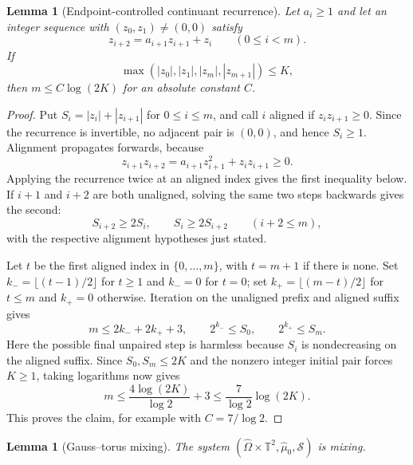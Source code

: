 \documentclass[11pt,a4paper]{amsart}
\newtheorem{lemma}[theorem]{Lemma}
\theoremstyle{definition}
\theoremstyle{remark}
\newcommand{\T}{\mathbb T}
\begin{document}
\begin{lemma}[Endpoint-controlled continuant recurrence]
\label{lem:endpoint-recurrence}
Let $a_i\ge1$ and let an integer sequence with $(z_0,z_1)\ne(0,0)$ satisfy
\[
 z_{i+2}=a_{i+1}z_{i+1}+z_i\qquad(0\le i<m).
\]
If
\[
 \max(|z_0|,|z_1|,|z_m|,|z_{m+1}|)\le K,
\]
then $m\le C\log(2K)$ for an absolute constant $C$.
\end{lemma}

\begin{proof}
Put $S_i=|z_i|+|z_{i+1}|$ for $0\le i\le m$, and call $i$ aligned if
$z_i z_{i+1}\ge0$.  Since the recurrence is invertible, no adjacent pair is
$(0,0)$, and hence $S_i\ge1$.  Alignment propagates forwards,
because
\[
 z_{i+1}z_{i+2}
 =a_{i+1}z_{i+1}^2+z_i z_{i+1}\ge0.
\]
Applying the recurrence twice at an aligned index gives the first inequality
below.  If $i+1$ and $i+2$ are both unaligned, solving the same two steps
backwards gives the second:
\[
 S_{i+2}\ge2S_i,\qquad S_i\ge2S_{i+2}\qquad(i+2\le m),
\]
with the respective alignment hypotheses just stated.

Let $t$ be the first aligned index in $\{0,\ldots,m\}$, with $t=m+1$ if
there is none.  Set $k_-=\lfloor(t-1)/2\rfloor$ for $t\ge1$ and $k_-=0$
for $t=0$; set $k_+=\lfloor(m-t)/2\rfloor$ for $t\le m$ and $k_+=0$
otherwise.  Iteration on the unaligned prefix and aligned suffix gives
\[
 m\le2k_-+2k_++3,
 \qquad 2^{k_-}\le S_0,
 \qquad 2^{k_+}\le S_m.
\]
Here the possible final unpaired step is harmless because $S_i$ is
nondecreasing on the aligned suffix.  Since $S_0,S_m\le2K$ and the nonzero
integer initial pair forces $K\ge1$, taking logarithms now gives
\[
 m\le\frac{4\log(2K)}{\log2}+3
 \le\frac7{\log2}\log(2K).
\]
This proves the claim, for example with $C=7/\log2$.
\end{proof}

\begin{lemma}[Gauss--torus mixing]\label{lem:torus-mixing}
The system $(\widehat\Omega\times\T^2,\widehat\mu_0,\mathcal S)$ is mixing.
\end{lemma}
\end{document}
